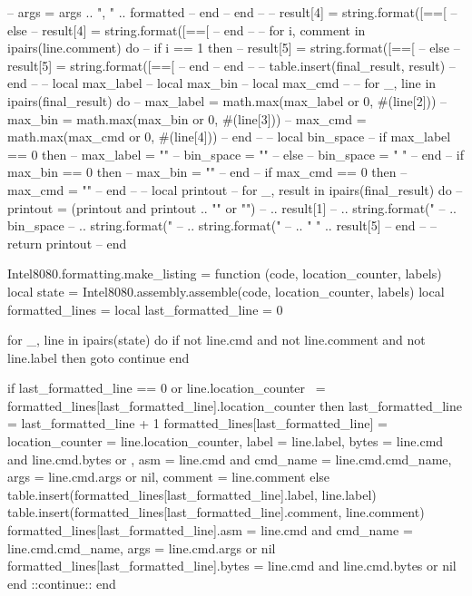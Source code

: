 --                     args = args .. ", " .. formatted
--                 end
--             end
-- 
--             result[4] = string.format([==[%
--         else
--             result[4] = string.format([==[%
--         end
-- 
--         for i, comment in ipairs(line.comment) do
--             if i == 1 then
--                 result[5] = string.format([==[%
--             else
--                 result[5] = string.format([==[ %
--             end
--         end
-- 
--         table.insert(final_result, result)
--     end
-- 
--     local max_label
--     local max_bin
--     local max_cmd
-- 
--     for _, line in ipairs(final_result) do
--         max_label = math.max(max_label or 0, #(line[2]))
--         max_bin = math.max(max_bin or 0, #(line[3]))
--         max_cmd = math.max(max_cmd or 0, #(line[4]))
--     end
-- 
--     local bin_space
--     if max_label == 0 then
--         max_label = ""
--         bin_space = ""
--     else
--         bin_space = "    "
--     end
--     if max_bin == 0 then
--         max_bin = ""
--     end
--     if max_cmd == 0 then
--         max_cmd = ""
--     end
-- 
--     local printout
--     for _, result in ipairs(final_result) do
--         printout = (printout and printout .. "\n" or "")
--             .. result[1]
--             .. string.format("    %
--             .. bin_space
--             .. string.format("%
--             .. string.format("    %
--             .. "    " .. result[5]
--     end
-- 
--     return printout
-- end

Intel8080.formatting.make_listing = function (code, location_counter, labels)
    local state = Intel8080.assembly.assemble(code, location_counter, labels)
    local formatted_lines = {}
    local last_formatted_line = 0

    for _, line in ipairs(state) do
        if not line.cmd and not line.comment and not line.label then
            goto continue
        end

        if last_formatted_line == 0 or line.location_counter ~= formatted_lines[last_formatted_line].location_counter then
            last_formatted_line = last_formatted_line + 1
            formatted_lines[last_formatted_line] = {
                location_counter = line.location_counter,
                label = {line.label},
                bytes = line.cmd and line.cmd.bytes or {},
                asm = line.cmd and {cmd_name = line.cmd.cmd_name, args = line.cmd.args} or nil,
                comment = {line.comment}
            }
        else
            table.insert(formatted_lines[last_formatted_line].label, line.label)
            table.insert(formatted_lines[last_formatted_line].comment, line.comment)
            formatted_lines[last_formatted_line].asm = line.cmd and {cmd_name = line.cmd.cmd_name, args = line.cmd.args} or nil
            formatted_lines[last_formatted_line].bytes = line.cmd and line.cmd.bytes or nil
        end
        ::continue::
    end

